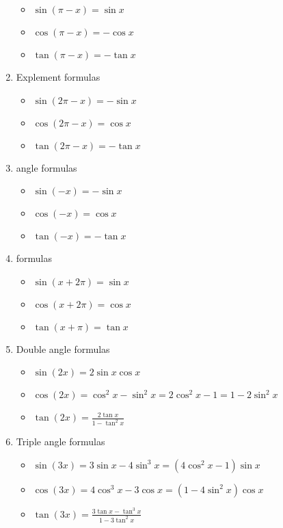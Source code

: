 \documentclass[12pt]{article}
\theoremstyle{definition}
\begin{document}
\begin{enumerate}
\begin{itemize}
\item $\sin(\pi-x) = \sin{x}$
\item $\cos(\pi-x) = -\cos{x}$
\item $\tan(\pi-x) = -\tan{x}$
\end{itemize}

\item Explement formulas

\begin{itemize}
\item $\sin(2\pi-x) = -\sin{x}$
\item $\cos(2\pi-x) = \cos{x}$
\item $\tan(2\pi-x) = -\tan{x}$
\end{itemize}

\item {} angle formulas

\begin{itemize}
\item $\sin(-x) = -\sin{x}$
\item $\cos(-x) = \cos{x}$
\item $\tan(-x) = -\tan{x}$
\end{itemize}

\item {} formulas

\begin{itemize}
\item $\sin(x+2\pi) = \sin{x}$
\item $\cos(x+2\pi) = \cos{x}$
\item $\tan(x+\pi) = \tan{x}$
\end{itemize}

\item Double angle formulas

\begin{itemize}
\item $\sin(2x) = 2\sin{x}\cos{x}$
\item $\cos(2x) = \cos^2{x}-\sin^2{x} = 2\cos^2{x}-1 = 1-2\sin^2{x}$
\item $\displaystyle \tan(2x) = \frac{2\tan{x}}{1-\tan^2{x}}$
\end{itemize}

\item Triple angle formulas

\begin{itemize}
\item $\sin(3x) = 3\sin{x}-4\sin^3{x} = (4\cos^2{x}-1)\sin{x}$
\item $\cos(3x) = 4\cos^3{x}-3\cos{x} = (1-4\sin^2{x})\cos{x}$
\item $\displaystyle \tan(3x) = \frac{3\tan{x}-\tan^3{x}}{1-3\tan^2{x}}$
\end{itemize}


\end{enumerate}
\end{document}
